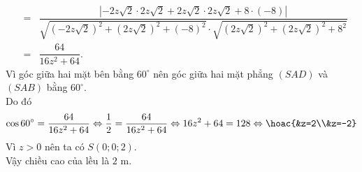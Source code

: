 \begin{ex}
{\begin{eqnarray*}
			&=&\dfrac{|-2z\sqrt{2}\cdot 2z\sqrt{2}+2z\sqrt{2}\cdot 2z\sqrt{2}+8\cdot(-8)|}{\sqrt{(-2z\sqrt{2})^2+(2z\sqrt{2})^2+(-8)^2}\cdot \sqrt{(2z\sqrt{2})^2+(2z\sqrt{2})^2+8^2}}\\
			&=&\dfrac{64}{16z^2+64}.
		\end{eqnarray*}
		Vì góc giữa hai mặt bên bằng $60^{\circ}$ nên góc giữa hai mặt phẳng $(SAD)$ và $(SAB)$ bằng $60^{\circ}$.\\
		Do đó
		$$\cos 60^{\circ}=\dfrac{64}{16z^2+64} \Leftrightarrow \dfrac{1}{2}=\dfrac{64}{16z^2+64}\Leftrightarrow 16z^2+64=128\Leftrightarrow \hoac{&z=2\\&z=-2}$$
		Vì $z>0$ nên ta có $S(0;0;2)$.\\
		Vậy chiều cao của lều là $2$ m.
	}
\end{ex}
